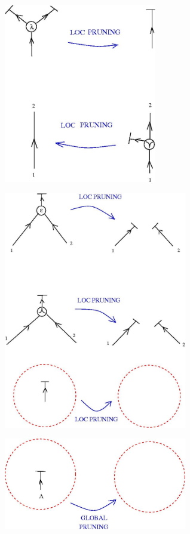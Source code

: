 \documentclass{article}
\begin{document}
\centerline{\includegraphics[width=0.5\textwidth]{../img/glc/lambdapr.jpg}
}
\vspace{.5cm}

\centerline{\includegraphics[width=0.6\textwidth]{../img/glc/epsipr.jpg}
}
\vspace{.5cm}


\vspace{.5cm}
 
\centerline{\includegraphics[width=0.6\textwidth]{../img/glc/globalpr.jpg}
}
\vspace{.5cm}
\end{document}
